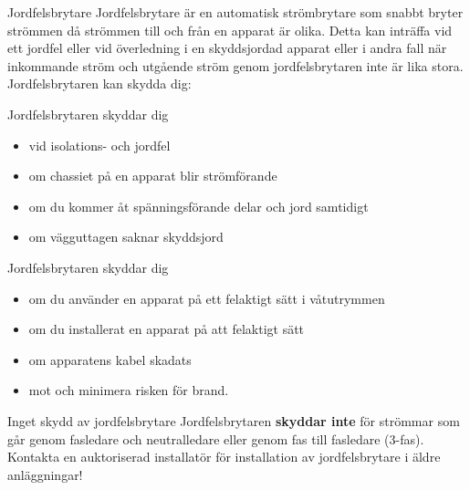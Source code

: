 \documentclass{beamer}
\begin{document}
\begin{frame}{Jordfelsbrytare}
Jordfelsbrytare är en automatisk strömbrytare som snabbt bryter strömmen
då strömmen till och från en apparat är olika.
Detta kan inträffa vid ett jordfel eller vid överledning i en skyddsjordad
apparat eller i andra fall när inkommande ström och utgående ström genom
jordfelsbrytaren inte är lika stora.\\
\vspace{5mm}
Jordfelsbrytaren kan skydda dig:
\end{frame}

\begin{frame}{Jordfelsbrytaren skyddar dig}
\begin{itemize}
	\item vid isolations- och jordfel
	\item om chassiet på en apparat blir strömförande
	\item om du kommer åt spänningsförande delar och jord samtidigt
	\item om vägguttagen saknar skyddsjord
\end{itemize}
\end{frame}

\begin{frame}{Jordfelsbrytaren skyddar dig}
\begin{itemize}
	\item om du använder en apparat på ett felaktigt sätt i våtutrymmen
	\item om du installerat en apparat på att felaktigt sätt
	\item om apparatens kabel skadats
	\item mot och minimera risken för brand.
\end{itemize}
\end{frame}

\begin{frame}{Inget skydd av jordfelsbrytare}
Jordfelsbrytaren \textbf{skyddar inte} för strömmar som går genom fasledare
och neutralledare eller genom fas till fasledare (3-fas).\\
\vspace{5mm}
Kontakta en auktoriserad installatör för installation av jordfelsbrytare i äldre
anläggningar!
\end{frame}
\end{document}
